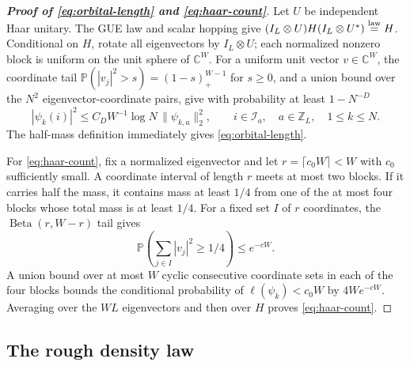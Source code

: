 \documentclass[11pt]{article}
\numberwithin{equation}{section}
\theoremstyle{remark}
\newcommand{\Prob}{\mathbb P}
\newcommand{\Z}{\mathbb Z}
\newcommand{\C}{\mathbb C}
\begin{document}
\begin{proof}[\textbf{Proof of \eqref{eq:orbital-length} and \eqref{eq:haar-count}}]
Let $U$ be independent Haar unitary. The GUE law and scalar hopping give
$(I_L\otimes U)H(I_L\otimes U^*)\stackrel{\rm law}=H$.
Conditional on $H$, rotate all eigenvectors by $I_L\otimes U$;
each normalized nonzero block is uniform on the unit sphere of $\C^W$.
For a uniform unit vector $v\in\C^W$, the coordinate tail
$\Prob(|v_j|^2>s)=(1-s)_+^{W-1}$ for $s\ge0$, and a union bound
over the $N^2$ eigenvector-coordinate pairs, give with probability
at least $1-N^{-D}$
\begin{equation}\label{eq:orbital}
 |\psi_k(i)|^2\le C_DW^{-1}\log N\,\|\psi_{k,a}\|_2^2,
 \qquad i\in\mathcal I_a,\quad a\in\Z_L,\quad 1\le k\le N.
\end{equation}
The half-mass definition immediately gives \eqref{eq:orbital-length}.

For \eqref{eq:haar-count}, fix a normalized eigenvector and let
$r=\lceil c_0W\rceil<W$ with $c_0$ sufficiently small. A coordinate
interval of length $r$ meets at most two blocks. If it carries half
the mass, it contains mass at least $1/4$ from one of the at most
four blocks whose total mass is at least $1/4$.
For a fixed set $I$ of $r$ coordinates, the
$\operatorname{Beta}(r,W-r)$ tail gives
\[
 \Prob\left(\sum_{j\in I}|v_j|^2\ge1/4\right)\le e^{-cW}.
\]
A union bound over at most $W$ cyclic consecutive coordinate sets in each
of the four blocks bounds the conditional probability of
$\ell(\psi_k)<c_0W$ by $4We^{-cW}$. Averaging over the $WL$
eigenvectors and then over $H$ proves \eqref{eq:haar-count}.
\end{proof}

\subsection{The rough density law}
\label{sec:rough-density-proof}
\end{document}
